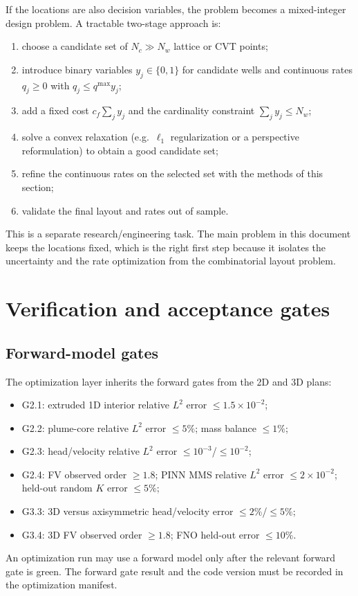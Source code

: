 \documentclass[11pt]{article}
\numberwithin{equation}{section}
\theoremstyle{plain}
\begin{document}
If the locations are also decision variables, the problem becomes a
mixed-integer design problem.  A tractable two-stage approach is:
\begin{enumerate}[leftmargin=1.6em,itemsep=2pt]
  \item choose a candidate set of $N_c\gg N_w$ lattice or CVT points;
  \item introduce binary variables $y_j\in\{0,1\}$ for candidate wells and
        continuous rates $q_j\ge0$ with $q_j\le q^{\max}y_j$;
  \item add a fixed cost $c_f\sum_j y_j$ and the cardinality constraint
        $\sum_j y_j\le N_w$;
  \item solve a convex relaxation (e.g.\ $\ell_1$ regularization or a
        perspective reformulation) to obtain a good candidate set;
  \item refine the continuous rates on the selected set with the methods of
        this section;
  \item validate the final layout and rates out of sample.
\end{enumerate}
This is a separate research/engineering task.  The main problem in this
document keeps the locations fixed, which is the right first step because it
isolates the uncertainty and the rate optimization from the combinatorial
layout problem.

\section{Verification and acceptance gates}
\label{sec:gates}

\subsection{Forward-model gates}

The optimization layer inherits the forward gates from the 2D and 3D plans:
\begin{itemize}[leftmargin=1.6em,itemsep=2pt]
  \item G2.1: extruded 1D interior relative $L^2$ error $\le1.5\times10^{-2}$;
  \item G2.2: plume-core relative $L^2$ error $\le5\%$; mass balance $\le1\%$;
  \item G2.3: head/velocity relative $L^2$ error $\le10^{-3}$/$\le10^{-2}$;
  \item G2.4: FV observed order $\ge1.8$; PINN MMS relative $L^2$ error
        $\le2\times10^{-2}$; held-out random $K$ error $\le5\%$;
  \item G3.3: 3D versus axisymmetric head/velocity error $\le2\%$/$\le5\%$;
  \item G3.4: 3D FV observed order $\ge1.8$; FNO held-out error $\le10\%$.
\end{itemize}
An optimization run may use a forward model only after the relevant forward
gate is green.  The forward gate result and the code version must be recorded
in the optimization manifest.
\end{document}
